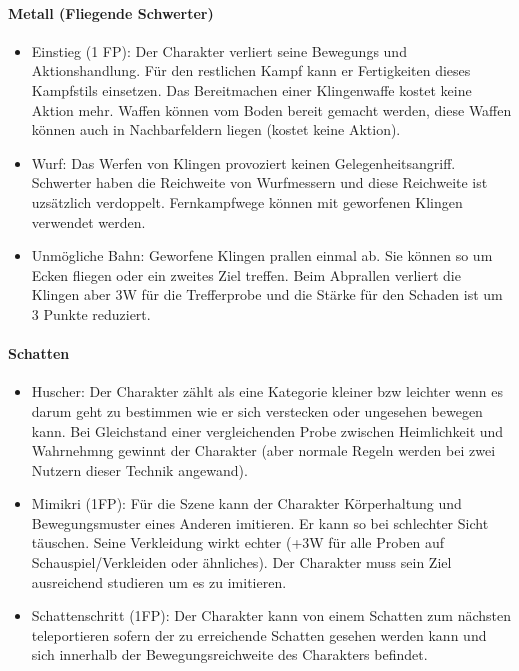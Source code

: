 \documentclass{article}
\begin{document}
\paragraph{Metall (Fliegende Schwerter)}

\begin{itemize}
\item Einstieg (1 FP): Der Charakter verliert seine Bewegungs und Aktionshandlung. Für den restlichen Kampf kann er Fertigkeiten dieses Kampfstils einsetzen. Das Bereitmachen einer Klingenwaffe kostet keine Aktion mehr. Waffen können vom Boden bereit gemacht werden, diese Waffen können auch in Nachbarfeldern liegen (kostet keine Aktion).
\item Wurf: Das Werfen von Klingen provoziert keinen Gelegenheitsangriff. Schwerter haben die Reichweite von Wurfmessern und diese Reichweite ist uzsätzlich verdoppelt. Fernkampfwege können mit geworfenen Klingen verwendet werden.
\item Unmögliche Bahn: Geworfene Klingen prallen einmal ab. Sie können so um Ecken fliegen oder ein zweites Ziel treffen. Beim Abprallen verliert die Klingen aber 3W für die Trefferprobe und die Stärke für den Schaden ist um 3 Punkte reduziert.
\end{itemize}

\paragraph{Schatten}

\begin{itemize}
\item Huscher: Der Charakter zählt als eine Kategorie kleiner bzw leichter wenn es darum geht zu bestimmen wie er sich verstecken oder ungesehen bewegen kann. Bei Gleichstand einer vergleichenden Probe zwischen Heimlichkeit und Wahrnehmng gewinnt der Charakter (aber normale Regeln werden bei zwei Nutzern dieser Technik angewand).
\item Mimikri (1FP): Für die Szene kann der Charakter Körperhaltung und Bewegungsmuster eines Anderen imitieren. Er kann so bei schlechter Sicht täuschen. Seine Verkleidung wirkt echter (+3W für alle Proben auf Schauspiel/Verkleiden oder ähnliches). Der Charakter muss sein Ziel ausreichend studieren um es zu imitieren.
\item Schattenschritt (1FP): Der Charakter kann von einem Schatten zum nächsten teleportieren sofern der zu erreichende Schatten gesehen werden kann und sich innerhalb der Bewegungsreichweite des Charakters befindet.
\end{itemize}
\end{document}
